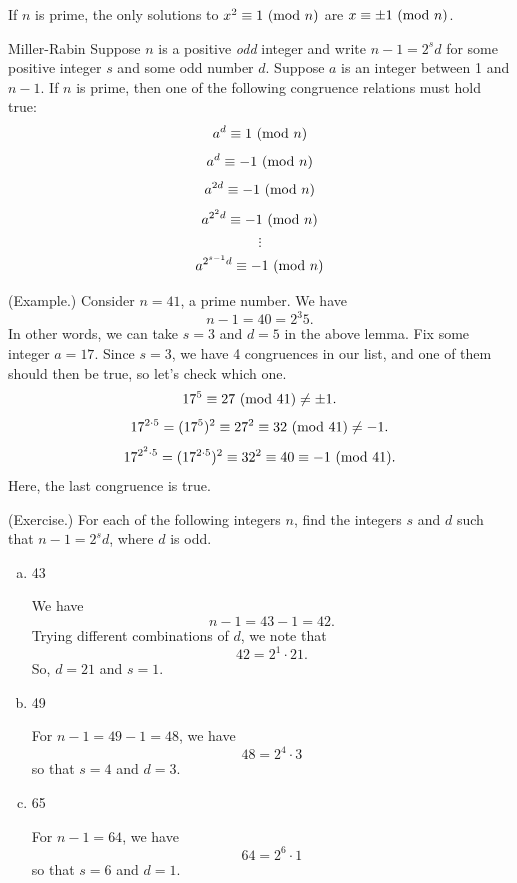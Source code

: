 \documentclass[letterpaper]{article}
\begin{document}
\begin{lemma}{}{}
    If $n$ is prime, the only solutions to $x^2 \equiv 1 \ (\mathrm{mod}\ n)$ are $x \equiv \pm 1 \ (\mathrm{mod}\ n)$.
\end{lemma}

\begin{lemma}{Miller-Rabin}{}
    Suppose $n$ is a positive \emph{odd} integer and write $n - 1 = 2^s d$ for some positive integer $s$ and some odd number $d$. Suppose $a$ is an integer between 1 and $n - 1$. If $n$ is prime, then one of the following congruence relations must hold true: 
    \[a^d \equiv 1 \ (\mathrm{mod}\ n)\]
    \[a^d \equiv -1 \ (\mathrm{mod}\ n)\]
    \[a^{2d} \equiv -1 \ (\mathrm{mod}\ n)\]
    \[a^{2^2 d} \equiv -1 \ (\mathrm{mod}\ n)\]
    \[\vdots\]
    \[a^{2^{s - 1}d} \equiv -1 \ (\mathrm{mod}\ n)\]
\end{lemma}

\begin{mdframed}
    (Example.) Consider $n = 41$, a prime number. We have 
    \[n - 1 = 40 = 2^3 5.\]
    In other words, we can take $s = 3$ and $d = 5$ in the above lemma. Fix some integer $a = 17$. Since $s = 3$, we have 4 congruences in our list, and one of them should then be true, so let's check which one. 
    \[17^5 \equiv 27 \ (\mathrm{mod}\ 41) \neq \pm 1.\]
    \[17^{2 \cdot 5} = (17^5)^2 \equiv 27^2 \equiv 32 \ (\mathrm{mod}\ 41) \neq -1.\]
    \[17^{2^2 \cdot 5} = (17^{2 \cdot 5})^2 \equiv 32^2 \equiv 40 \equiv -1 \ (\mathrm{mod}\ 41).\]
    Here, the last congruence is true.
\end{mdframed}

\begin{mdframed}
    (Exercise.) For each of the following integers $n$, find the integers $s$ and $d$ such that $n - 1 = 2^s d$, where $d$ is odd. 

    \begin{enumerate}[(a)]
        \item 43 
        \begin{mdframed}
            We have 
            \[n - 1  = 43 - 1 = 42.\]
            Trying different combinations of $d$, we note that 
            \[42 = 2^1 \cdot 21.\]
            So, $d = 21$ and $s = 1$. 
        \end{mdframed}

        \item 49 
        \begin{mdframed}
            For $n - 1 = 49 - 1 = 48$, we have \[48 = 2^4 \cdot 3\] so that $s = 4$ and $d = 3$.
        \end{mdframed}
        
        \item 65 
        \begin{mdframed}
            For $n - 1 = 64$, we have \[64 = 2^6 \cdot 1\] so that $s = 6$ and $d = 1$. 
        \end{mdframed}
    \end{enumerate}
\end{mdframed}
\end{document}
